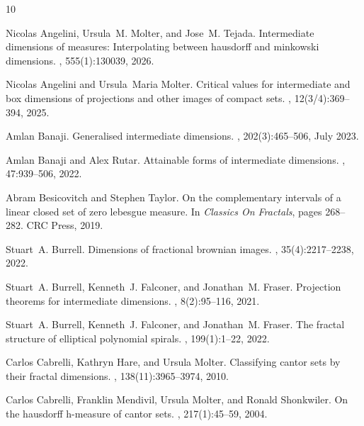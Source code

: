 \documentclass[11pt,reqno,bookmarksnumbered,raiselinks,breaklinks,colorlinks,plainpages]{amsart}
\begin{document}
\begin{thebibliography}{10}

Nicolas Angelini, Ursula~M. Molter, and Jose~M. Tejada.
\newblock Intermediate dimensions of measures: Interpolating between hausdorff and minkowski dimensions.
, 555(1):130039, 2026.

Nicolas Angelini and Ursula~Maria Molter.
\newblock Critical values for intermediate and box dimensions of projections and other images of compact sets.
, 12(3/4):369--394, 2025.

Amlan Banaji.
\newblock Generalised intermediate dimensions.
, 202(3):465–506, July 2023.

Amlan Banaji and Alex Rutar.
\newblock Attainable forms of intermediate dimensions.
, 47:939--506, 2022.

Abram Besicovitch and Stephen Taylor.
\newblock On the complementary intervals of a linear closed set of zero lebesgue measure.
\newblock In {\em Classics On Fractals}, pages 268--282. CRC Press, 2019.

Stuart~A. Burrell.
\newblock Dimensions of fractional brownian images.
, 35(4):2217--2238, 2022.

Stuart~A. Burrell, Kenneth~J. Falconer, and Jonathan~M. Fraser.
\newblock Projection theorems for intermediate dimensions.
, 8(2):95--116, 2021.

Stuart~A. Burrell, Kenneth~J. Falconer, and Jonathan~M. Fraser.
\newblock The fractal structure of elliptical polynomial spirals.
, 199(1):1--22, 2022.

Carlos Cabrelli, Kathryn Hare, and Ursula Molter.
\newblock Classifying cantor sets by their fractal dimensions.
, 138(11):3965--3974, 2010.

Carlos Cabrelli, Franklin Mendivil, Ursula Molter, and Ronald Shonkwiler.
\newblock On the hausdorff h-measure of cantor sets.
, 217(1):45--59, 2004.


\end{thebibliography}
\end{document}
